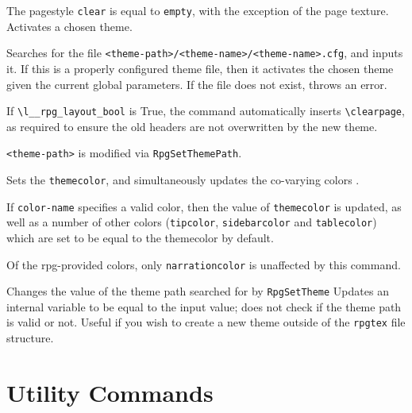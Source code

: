 \begin{macrolist}
{					The pagestyle \verb|clear| is equal to \verb|empty|, with the exception of the page texture.
				}
				{
					Activates a chosen theme.
				}
				{
				}
				{
					Searches for the file \verb|<theme-path>/<theme-name>/<theme-name>.cfg|, and inputs it. If this is a properly configured theme file, then it activates the chosen theme given the current global parameters. If the file does not exist, throws an error.

					If   \texttt{\textbackslash{}l\_\_rpg\_layout\_bool} is True, the command automatically inserts \verb|\clearpage|, as required to ensure the old headers are not overwritten by the new theme.

					\verb|<theme-path>| is modified via \verb|RpgSetThemePath|.
				}

				{
					Sets the \verb|themecolor|, and simultaneously updates the co-varying colors .
				}{
				}{
					If \verb|color-name| specifies a valid color, then the value of \verb|themecolor| is updated, as well as a number of other colors (\verb|tipcolor|, \verb|sidebarcolor| and \verb|tablecolor|) which are set to be equal to the themecolor by default.

					Of the rpg-provided colors, only \verb|narrationcolor| is unaffected by this command.
				}
				{
					Changes the value of the theme path searched for by \verb|RpgSetTheme|
				}
				{
				}
				{
					Updates an internal variable to be equal to the input value; does not check if the theme path is valid or not. Useful if you wish to create a new theme outside of the \verb|rpgtex| file structure.
				}
			
		\end{macrolist}
	\section{Utility Commands}

